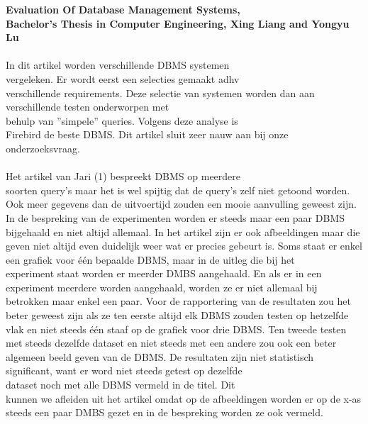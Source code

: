 \documentclass[fleqn,10pt]{artikeltin}
\begin{document}
\textbf{Evaluation Of Database Management Systems, \\Bachelor's Thesis in Computer Engineering, Xing Liang and Yongyu Lu}\\\\
In dit artikel worden verschillende DBMS systemen \\vergeleken. Er wordt eerst een selecties gemaakt adhv \\verschillende requirements. Deze selectie van systemen worden dan aan verschillende testen onderworpen met \\behulp van ''simpele'' queries. Volgens deze analyse is \\Firebird de beste DBMS. Dit artikel sluit zeer nauw aan bij onze onderzoeksvraag.\\\\
Het artikel van Jari (1) bespreekt DBMS op meerdere \\soorten query’s maar het is wel spijtig dat de query’s zelf niet getoond worden. Ook meer gegevens dan de uitvoertijd zouden een mooie aanvulling geweest zijn. In de bespreking van de experimenten worden er steeds maar een paar DBMS bijgehaald en niet altijd allemaal. In het artikel zijn er ook afbeeldingen maar die geven niet altijd even duidelijk weer wat er precies gebeurt is. Soms staat er enkel een grafiek voor één bepaalde DBMS, maar in de uitleg die bij het \\experiment staat worden er meerder DMBS aangehaald. En als er in een experiment meerdere worden aangehaald, worden ze er niet allemaal bij betrokken maar enkel een paar. Voor de rapportering van de resultaten zou het beter geweest zijn als ze ten eerste altijd elk DBMS zouden testen op hetzelfde vlak en niet steeds één staaf op de grafiek voor drie DBMS. Ten tweede testen met steeds dezelfde dataset en niet steeds met een andere zou ook een beter algemeen beeld geven van de DBMS. De resultaten zijn niet statistisch significant, want er word niet steeds getest op dezelfde \\dataset noch met alle DBMS vermeld in de titel. Dit \\kunnen we afleiden uit het artikel omdat op de afbeeldingen worden er op de x-as steeds een paar DMBS gezet en in de bespreking worden ze ook vermeld.\\\\
\end{document}
